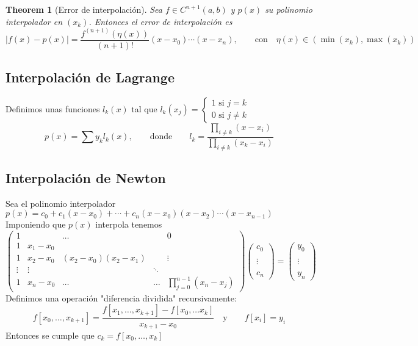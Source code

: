 \documentclass[leqno]{article}
\newtheorem*{theorem}{Theorem}
\begin{document}
\begin{theorem}[Error de interpolación]
Sea $f\in C^{n+1}(a, b)$ y $p(x)$ su polinomio interpolador en  $(x_k)$. Entonces el error de interpolación es
\[
|f(x)-p(x)| = \frac{f^{(n+1)}(\eta (x))}{(n+1)!}(x-x_0)\cdots (x-x_n), \qquad  \text{con}\quad \eta(x) \in (\min(x_k), \max(x_k))
\] 
\end{theorem}

\subsection{Interpolación de Lagrange}
Definimos unas funciones $l_k(x)$ tal que $l_k(x_j) =\begin{cases}
  1 \text{ si } j=k \\
  0 \text{ si } j\neq k
\end{cases}$
\[
\boxed{p(x) = \sum y_kl_k(x)} , \qquad \text{donde} \qquad l_k = \frac{\prod_{i\neq k}(x-x_i)}{\prod_{i\neq k}(x_k-x_i)}
\] 

\subsection{Interpolación de Newton}
Sea el polinomio interpolador $p(x) = c_0 + c_1(x-x_0) + \cdots + c_n(x-x_0)(x-x_2)\cdots (x-x_{n-1})$
Imponiendo que $p(x)$ interpola tenemos
 \[
{\begin{pmatrix}1&&\ldots &&0\\1&x_{1}-x_{0}&&&\\1&x_{2}-x_{0}&(x_{2}-x_{0})(x_{2}-x_{1})&&\vdots \\\vdots &\vdots &&\ddots &\\1&x_{n}-x_{0}&\ldots &\ldots &\prod _{{j=0}}^{{n-1}}(x_{n}-x_{j})\end{pmatrix}}{\begin{pmatrix}c_{0}\\\\\vdots \\\\c_{{n}}\end{pmatrix}}={\begin{pmatrix}y_{0}\\\\\vdots \\\\y_{{n}}\end{pmatrix}}
\] 
Definimos una operación "diferencia dividida" recursivamente:
\[
f[x_0, \ldots, x_{k+1}] = \frac{f[x_1, \ldots , x_{k+1}] - f[x_0, \ldots x_k]}{x_{k+1}-x_0} \quad \text{y} \qquad f[x_i] =y_i
\] 
Entonces se cumple que  $\displaystyle \boxed{c_k = f[x_0, \ldots, x_k]}$
\end{document}
